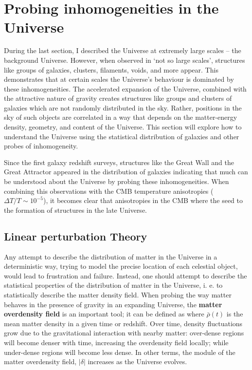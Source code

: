 \section{Probing inhomogeneities in the Universe}
During the last section, I described the Universe at extremely large scales -- the background Universe. However, when observed in `not so large scales', structures like groups of galaxies, clusters, filaments, voids, and more appear. This demonstrates that at certain scales the Universe's behaviour is dominated by these inhomogeneities. The accelerated expansion of the Universe, combined with the attractive nature of gravity creates structures like groups and clusters of galaxies which are not randomly distributed in the sky. Rather, positions in the sky of such objects are correlated in a way that depends on the matter-energy density, geometry, and content of the Universe. This section will explore how to understand the Universe using the statistical distribution of galaxies and other probes of inhomogeneity.

\qquad Since the first galaxy redshift surveys, structures like the Great Wall \citep{SloanGreatWall} and the Great Attractor \citep{ScharfLahav1992} appeared in the distribution of galaxies indicating that much can be understood about the Universe by probing these inhomogeneities. When combining this observations with the CMB temperature anisotropies ($\Delta T/T \sim 10^{-5}$), it becomes clear that anisotropies in the CMB where the seed to the formation of structures in the late Universe. 

\subsection{Linear perturbation Theory}\label{Sec:Intro:LinTheory}
Any attempt to describe the distribution of matter in the Universe in a deterministic way, trying to model the precise location of each celestial object, would lead to frustration and failure. Instead, one should attempt to describe the statistical properties of the distribution of matter in the Universe, i. e. to statistically describe the matter density field. When probing the way matter behaves in the presence of gravity in an expanding Universe, the \textbf{matter overdensity field} is an important tool;  it can be defined as
where $\bar{\rho}(t)$ is the mean matter density in a given time or redshift. Over time, density fluctuations grow due to the gravitational interaction with nearby matter: over-dense regions will become denser with time, increasing the overdensity field locally; while under-dense regions will become less dense. In other terms, the module of the matter overdensity field, $| \delta |$ increases as the Universe evolves.

